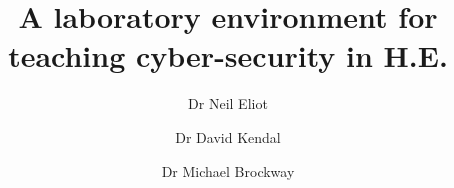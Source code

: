 %
%
%
%
%
%
\RequirePackage{fix-cm}
%
\documentclass[smallextended]{svjour3}       %
%
\smartqed  %
%
\usepackage{graphicx}
%
%
%
%
%


\title{A laboratory environment for teaching cyber-security in H.E.%
}


\author{Dr Neil Eliot \and
        Dr David Kendal \and
        Dr Michael Brockway
}


